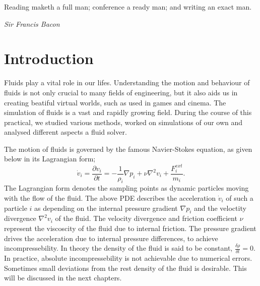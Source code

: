 \documentclass[11pt, letterpaper, twocolumn]{article}
\begin{document}


\epigraph{Reading maketh a full man; conference a ready man; and writing an exact man.}
{\textit{Sir Francis Bacon}}

\section{Introduction} \label{sec:introduction}

Fluids play a vital role in our lifes. Understanding the motion and behaviour of fluids is not only crucial to many fields of engineering, but it also aids us in creating beatiful virtual worlds, such as used in games and cinema. The simulation of fluids is a vast and rapidly growing field. During the course of this practical, we studied various methods, worked on simulations of our own and analysed different aspects a fluid solver.  

The motion of fluids is governed by the famous Navier-Stokes equation, as given below in its Lagrangian form;
\begin{equation}
  \dot{v}_i = \frac{\partial v_i}{\partial t} = -\frac{1}{\rho_i}\nabla p_i +\nu \nabla^2 v_i + \frac{F^{ext}_i}{m_i}.
\end{equation}
The Lagrangian form denotes the sampling points as dynamic particles moving with the flow of the fluid. The above PDE describes the acceleration \( \dot{v}_i\) of such a particle \( i \) as depending on the internal pressure gradient \( \nabla p_i\) and the veloctity divergence \( \nabla^2 v_i\) of the fluid. The velocity divergence and friction coefficient \( \nu \) represent the viscoscity of the fluid due to internal friction. The pressure gradient drives the acceleration due to internal pressure differences, to achieve incompressebility. In theory the density of the fluid is said to be constant, 
\(\frac{\delta \rho}{\delta t} = 0.\)
In practice, absolute incompressebility is not achievable due to numerical errors. Sometimes small deviations from the rest density of the fluid is desirable. This will be discussed in the next chapters. \cite{bender2015, ihmsen2014}
\end{document}
